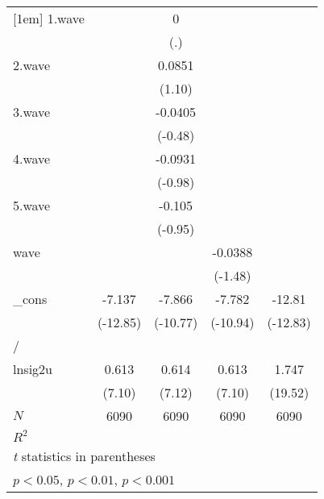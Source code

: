 {\begin{tabular}{l*{4}{c}}
[1em]
1.wave      &                     &           0         &                     &                     \\
            &                     &         (.)         &                     &                     \\
[1em]
2.wave      &                     &      0.0851         &                     &                     \\
            &                     &      (1.10)         &                     &                     \\
[1em]
3.wave      &                     &     -0.0405         &                     &                     \\
            &                     &     (-0.48)         &                     &                     \\
[1em]
4.wave      &                     &     -0.0931         &                     &                     \\
            &                     &     (-0.98)         &                     &                     \\
[1em]
5.wave      &                     &      -0.105         &                     &                     \\
            &                     &     (-0.95)         &                     &                     \\
[1em]
wave        &                     &                     &     -0.0388         &                     \\
            &                     &                     &     (-1.48)         &                     \\
[1em]
\_cons      &      -7.137\sym{***}&      -7.866\sym{***}&      -7.782\sym{***}&      -12.81\sym{***}\\
            &    (-12.85)         &    (-10.77)         &    (-10.94)         &    (-12.83)         \\
\hline
/           &                     &                     &                     &                     \\
lnsig2u     &       0.613\sym{***}&       0.614\sym{***}&       0.613\sym{***}&       1.747\sym{***}\\
            &      (7.10)         &      (7.12)         &      (7.10)         &     (19.52)         \\
\hline
\(N\)       &        6090         &        6090         &        6090         &        6090         \\
\(R^{2}\)   &                     &                     &                     &                     \\
\hline\hline
\multicolumn{5}{l}{\footnotesize \textit{t} statistics in parentheses}\\
\multicolumn{5}{l}{\footnotesize \sym{*} \(p<0.05\), \sym{**} \(p<0.01\), \sym{***} \(p<0.001\)}\\
\end{tabular}
}
